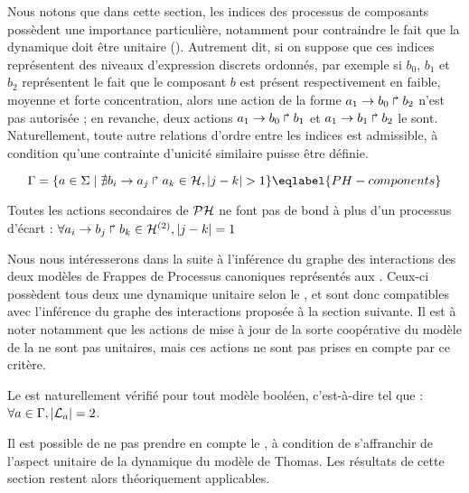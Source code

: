 Nous notons que dans cette section, les indices des processus de composants
possèdent une importance particulière,
notamment pour contraindre le fait que la dynamique doit être unitaire ().
Autrement dit, si on suppose que ces indices représentent des niveaux d'expression discrets
ordonnés,
par exemple si $b_0$, $b_1$ et $b_2$ représentent le fait que le composant $b$
est présent respectivement en faible, moyenne et forte concentration,
alors une action de la forme $a_1\rightarrow b_0\Rsh b_2$ n'est pas autorisée ;
en revanche, deux actions $a_1\rightarrow b_0\Rsh b_1$ et $a_1\rightarrow b_1\Rsh b_2$ le sont.
Naturellement, toute autre relations d'ordre entre les indices est admissible,
à condition qu'une contrainte d'unicité similaire puisse être définie.

\begin{equation}
\components = \{a \in \PHs \mid \nexists \PHfrappe{b_i}{a_j}{a_k} \in \PHa, |j - k| > 1\} \\
\eqlabel{PH-components}
\end{equation}

\begin{critere}
  Toutes les actions secondaires de $\mathcal{PH}$ ne font pas de bond
  à plus d'un processus d'écart :
  $\forall a_i\rightarrow b_j\Rsh b_k \in \mathcal{H}^{(2)}, |j - k| = 1$
\end{critere}

\begin{example}
  Nous nous intéresserons dans la suite à l'inférence du graphe des interactions des deux
  modèles de Frappes de Processus canoniques représentés
  aux .
  Ceux-ci possèdent tous deux une dynamique unitaire selon le ,
  et sont donc compatibles
  avec l'inférence du graphe des interactions proposée à la section suivante.
  Il est à noter notamment que les actions de mise à jour de la sorte coopérative
  du modèle de la  ne sont pas unitaires, mais ces actions ne sont pas prises
  en compte par ce critère.
\end{example}

\begin{remark}
  Le  est naturellement vérifié pour tout modèle booléen,
  c'est-à-dire tel que : $\forall a \in \mathrm{\Gamma}, |\mathcal{L}_a| = 2$.
\end{remark}

\begin{remark}
  Il est possible de ne pas prendre en compte le ,
  à condition de s'affranchir de l'aspect unitaire de la dynamique du modèle de Thomas.
  Les résultats de cette section restent alors théoriquement applicables.
\end{remark}

